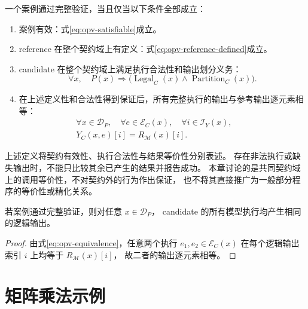 \begin{definition}[契约域上的调用等价性]
  一个案例通过完整验证，当且仅当以下条件全部成立：
  \begin{enumerate}
    \item 案例有效：式\eqref{eq:opv-satisfiable}成立。
    \item reference 在整个契约域上有定义：式\eqref{eq:opv-reference-defined}成立。
    \item candidate 在整个契约域上满足执行合法性和输出划分义务：
      \begin{equation}
        \forall x,\quad P(x)\Longrightarrow
        \bigl(\operatorname{Legal}_C(x)\land
        \operatorname{Partition}_C(x)\bigr).
        \label{eq:opv-candidate-obligations}
      \end{equation}
    \item 在上述定义性和合法性得到保证后，所有完整执行的输出与参考输出逐元素相等：
      \begin{equation}
        \begin{aligned}
          \forall x\in\mathcal{D}_P,\quad
          \forall e\in\mathcal{E}_C(x),\quad
          \forall i\in\mathcal{I}_Y(x),\qquad\\
          Y_C(x,e)[i]=R_{\mathcal{M}}(x)[i].
        \end{aligned}
        \label{eq:opv-equivalence}
      \end{equation}
  \end{enumerate}
\end{definition}

上述定义将契约有效性、执行合法性与结果等价性分别表述。
存在非法执行或缺失输出时，不能只比较其余已产生的结果并报告成功。
本章讨论的是共同契约域上的调用等价性，不对契约外的行为作出保证，
也不将其直接推广为一般部分程序的等价性或精化关系。

\begin{proposition}[可观察结果的确定性]
  若案例通过完整验证，则对任意 $x\in\mathcal{D}_P$，
  candidate 的所有模型执行均产生相同的逻辑输出。
\end{proposition}
\begin{proof}
  由式\eqref{eq:opv-equivalence}，任意两个执行 $e_1,e_2\in\mathcal{E}_C(x)$
  在每个逻辑输出索引 $i$ 上均等于 $R_{\mathcal{M}}(x)[i]$，
  故二者的输出逐元素相等。
\end{proof}

\section{矩阵乘法示例}
\label{sec:opv-matmul}

